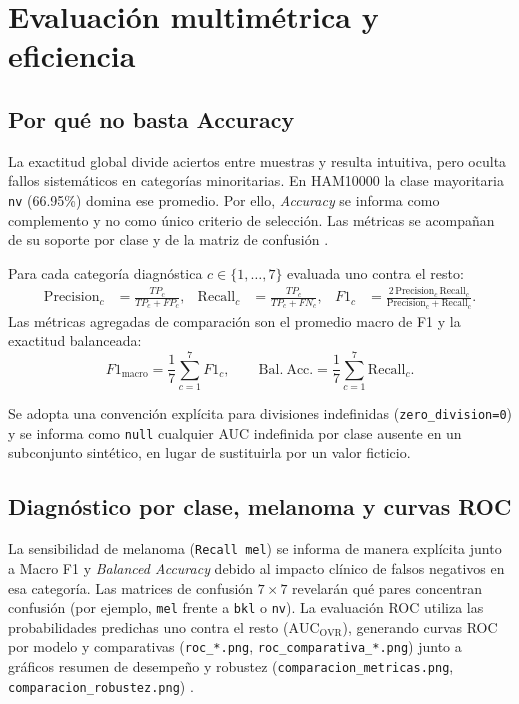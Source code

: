 \FloatBarrier\section{Evaluación multimétrica y eficiencia}

\subsection{Por qué no basta Accuracy}
La exactitud global divide aciertos entre muestras y resulta intuitiva, pero oculta fallos sistemáticos en categorías minoritarias. En HAM10000 la clase mayoritaria \texttt{nv} (66.95\%) domina ese promedio. Por ello, \textit{Accuracy} se informa como complemento y no como único criterio de selección. Las métricas se acompañan de su soporte por clase y de la matriz de confusión \cite{sklearn2011}.

\begin{tcolorbox}[teoriaBox,title={Definición de métricas multiclase y balanceo por categoría}]
Para cada categoría diagnóstica $c \in \{1,\dots,7\}$ evaluada uno contra el resto:
\begin{align}
\mathrm{Precision}_c &= \frac{TP_c}{TP_c+FP_c}, &
\mathrm{Recall}_c &= \frac{TP_c}{TP_c+FN_c}, &
F1_c &= \frac{2\,\mathrm{Precision}_c\,\mathrm{Recall}_c}{\mathrm{Precision}_c+\mathrm{Recall}_c}.
\end{align}
Las métricas agregadas de comparación son el promedio macro de F1 y la exactitud balanceada:
\begin{equation}
F1_{\mathrm{macro}}=\frac{1}{7}\sum_{c=1}^{7}F1_c, \qquad
\mathrm{Bal.\ Acc.}=\frac{1}{7}\sum_{c=1}^{7}\mathrm{Recall}_c.
\end{equation}
\end{tcolorbox}

Se adopta una convención explícita para divisiones indefinidas (\texttt{zero\_division=0}) y se informa como \texttt{null} cualquier AUC indefinida por clase ausente en un subconjunto sintético, en lugar de sustituirla por un valor ficticio.

\subsection{Diagnóstico por clase, melanoma y curvas ROC}
La sensibilidad de melanoma (\texttt{Recall mel}) se informa de manera explícita junto a Macro F1 y \textit{Balanced Accuracy} debido al impacto clínico de falsos negativos en esa categoría. Las matrices de confusión $7\times 7$ revelarán qué pares concentran confusión (por ejemplo, \texttt{mel} frente a \texttt{bkl} o \texttt{nv}). La evaluación ROC utiliza las probabilidades predichas uno contra el resto ($\mathrm{AUC}_{\mathrm{OVR}}$), generando curvas ROC por modelo y comparativas (\texttt{roc\_*.png}, \texttt{roc\_comparativa\_*.png}) junto a gráficos resumen de desempeño y robustez (\texttt{comparacion\_metricas.png}, \texttt{comparacion\_robustez.png}) \cite{saito2015}.

